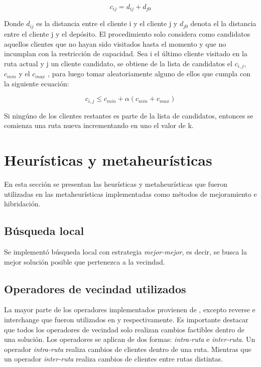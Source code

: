 \begin{itemize}
\begin{equation}\label{eq:cost_savings}
c_{ij} = d_{ij} + d_{j0} 
\end{equation}
  	
  	
	Donde $d_{ij}$ es la distancia entre el cliente i y el cliente j y $d_{j0}$ denota el la distancia entre el cliente j y el depósito. El procedimiento solo considera como candidatos aquellos clientes que no hayan sido visitados hasta el momento y que no incumplan con la restricción de capacidad. Sea i el último cliente visitado en la ruta actual y j un cliente candidato, se obtiene de la lista de candidatos el $c_{i,j}$, $c_{min}$ y el $c_{max}$ , para luego tomar aleatoriamente alguno de ellos que cumpla con la siguiente ecuación: 
	
\begin{equation}\label{eq:cost_savings}
c_{i,j} \leqslant c_{min} + \alpha(c_{min} + c_{max}) 
\end{equation}

	Si ningúno de los clientes restantes es parte de la lista de candidatos, entonces se comienza una ruta nueva incrementando en uno el valor de k. 

\end{itemize}


\section{Heurísticas y metaheurísticas} \label{sect:implementacion-heuristicas}

En esta sección se presentan las heurísticas y metaheurísticas que fueron utilizadas en las metaheurísticas implementadas como métodos de mejoramiento e hibridación.

\subsection{Búsqueda local} \label{sect:implementacion-busquedalocal}

Se implementó búsqueda local con estrategia \emph{mejor-mejor}, es decir, se busca la mejor solución posible que pertenezca a la vecindad.

\subsection*{Operadores de vecindad utilizados}

La mayor parte de los operadores implementados provienen  de \cite{operadoresLS}, excepto reverse e interchange que fueron utilizados en \cite{SalhiNagyLS} y \cite{gts} respectivamente. Es importante destacar que todos los operadores de vecindad solo realizan cambios factibles dentro de una solución. Los operadores se aplican de dos formas: \emph{intra-ruta} e \emph{inter-ruta}. Un operador \emph{intra-ruta} realiza cambios de clientes dentro de una ruta. Mientras que un operador \emph{inter-ruta} realiza cambios de clientes entre rutas distintas. 

